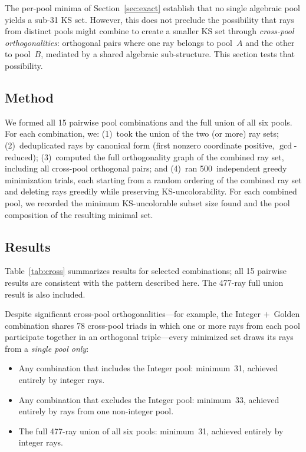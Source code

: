 \documentclass[twocolumn,pra,superscriptaddress,nofootinbib]{revtex4-2}
\begin{document}
The per-pool minima of Section~\ref{sec:exact} establish that no single
algebraic pool yields a sub-31 KS set. However, this does not preclude the
possibility that rays from distinct pools might combine to create a smaller KS
set through \emph{cross-pool orthogonalities}: orthogonal pairs where one ray
belongs to pool~$A$ and the other to pool~$B$, mediated by a shared algebraic
sub-structure. This section tests that possibility.

\subsection{Method}

We formed all 15 pairwise pool combinations and the full union of all six pools.
For each combination, we: (1)~took the union of the two (or more) ray sets;
(2)~deduplicated rays by canonical form (first nonzero coordinate positive,
$\gcd$-reduced); (3)~computed the full orthogonality graph of the combined ray
set, including all cross-pool orthogonal pairs; and (4)~ran 500~independent
greedy minimization trials, each starting from a random ordering of the combined
ray set and deleting rays greedily while preserving KS-uncolorability. For each
combined pool, we recorded the minimum KS-uncolorable subset size found and the
pool composition of the resulting minimal set.

\subsection{Results}

Table~\ref{tab:cross} summarizes results for selected combinations; all 15
pairwise results are consistent with the pattern described here. The 477-ray
full union result is also included.

Despite significant cross-pool orthogonalities---for example, the Integer
$+$~Golden combination shares 78 cross-pool triads in which one or more rays
from each pool participate together in an orthogonal triple---every minimized set
draws its rays from a \emph{single pool only}:
\begin{itemize}
\item Any combination that includes the Integer pool: minimum~31, achieved
  entirely by integer rays.
\item Any combination that excludes the Integer pool: minimum~33, achieved
  entirely by rays from one non-integer pool.
\item The full 477-ray union of all six pools: minimum~31, achieved entirely
  by integer rays.
\end{itemize}
\end{document}
